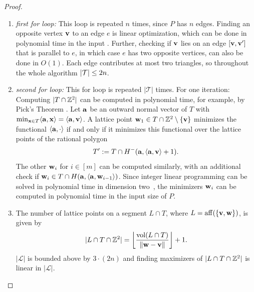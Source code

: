 \begin{proof}
    \begin{enumerate}
        \item \emph{first for loop:} This loop is repeated $n$ times, since $P$ has $n$ edges. Finding an opposite vertex $\mathbf{v}$ to an edge $e$ is linear optimization, which can be done in polynomial time in the input \cite{LP_Poly}. Further, checking if $\mathbf{v}$ lies on an edge $[\mathbf{v},\mathbf{v}']$ that is parallel to $e$, in which case $e$ has two opposite vertices, can also be done in $O(1)$. Each edge contributes at most two triangles, so throughout the whole algorithm $|\mathcal{T}| \leq 2n$.
        \item \emph{second for loop:} This for loop is repeated $|\mathcal{T}|$ times. For one iteration:
        Computing $|T \cap \mathbb{Z}^2|$ can be computed in polynomial time, for example, by Pick's Theorem \cite{pick99}. Let $\mathbf{a}$ be an outward normal vector of $T$ with $\min_{\mathbf{x} \in T} \langle \mathbf{a}, \mathbf{x} \rangle = \langle \mathbf{a},\mathbf{v} \rangle$.
        A lattice point $\mathbf{w}_1 \in T \cap \mathbb{Z}^2 \setminus \{\mathbf{v}\}$ minimizes the functional $\langle \mathbf{a}, \cdot \rangle$ if and only if it minimizes this functional over the lattice points of the rational polygon
        \[
        T' := T \cap H^-(\mathbf{a}, \langle \mathbf{a}, \mathbf{v} \rangle + 1).
        \]
        The other $\mathbf{w}_i$ for $i \in [m]$ can be computed similarly, with an additional check if $\mathbf{w}_i \in T \cap H(\mathbf{a}, \langle \mathbf{a}, \mathbf{w}_{i-1} \rangle)$. Since integer linear programming can be solved in polynomial time in dimension two~\cite{ILP-2d-poly}, the minimizers $\mathbf{w}_i$ can be computed in polynomial time in the input size of $P$. 
        \item The number of lattice points on a segment $L \cap T$, where $L = \operatorname{aff}(\{\mathbf{v},\mathbf{w}\})$, is given by
        \[
        |L \cap T \cap \mathbb{Z}^2| = \left\lfloor \frac{\operatorname{vol}(L \cap T)}{\|\mathbf{w} - \mathbf{v}\|} \right\rfloor + 1.
        \]
        $|\mathcal{L}|$ is bounded above by $3\cdot (2n)$
        and finding maximizers of $|L \cap T \cap \mathbb{Z}^2|$ is linear in $|\mathcal{L}|$.
    \end{enumerate}\vspace{-1.5em}
\end{proof}

